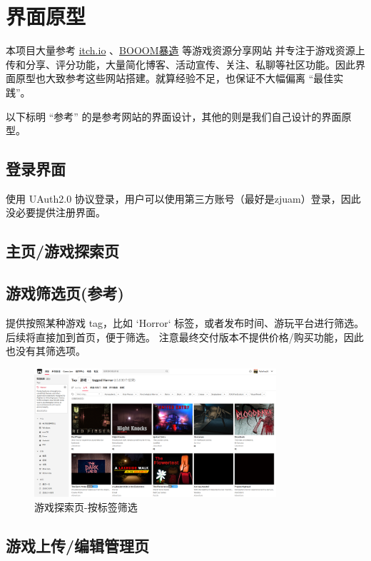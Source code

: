\documentclass[12pt]{ctexart} %
\begin{document}
\section{界面原型}

本项目大量参考 \href{https://itch.io}{itch.io} 、\href{https://www.gcores.com/booom/game_lib}{BOOOM暴造} 等游戏资源分享网站
并专注于游戏资源上传和分享、评分功能，大量简化博客、活动宣传、关注、私聊等社区功能。因此界面原型也大致参考这些网站搭建。就算经验不足，也保证不大幅偏离 “最佳实践”。

以下标明 “参考” 的是参考网站的界面设计，其他的则是我们自己设计的界面原型。

\subsection{登录界面}

使用 UAuth2.0 协议登录，用户可以使用第三方账号（最好是zjuam）登录，因此没必要提供注册界面。

\subsection{主页/游戏探索页}


\subsection{游戏筛选页(参考)}

提供按照某种游戏 tag，比如 `Horror` 标签，或者发布时间、游玩平台进行筛选。后续将直接加到首页，便于筛选。
注意最终交付版本不提供价格/购买功能，因此也没有其筛选项。

\begin{figure}[H]
  \centering
  \includegraphics[width=0.8\textwidth]{UI-tagged.png}
  \caption{游戏探索页-按标签筛选}
\end{figure}

\subsection{游戏上传/编辑管理页}
\end{document}
